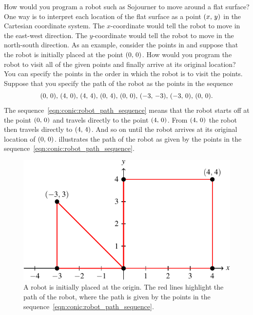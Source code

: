 \documentclass[a4paper,oneside,12pt]{article}
\begin{document}
How would you program a robot such as Sojourner to move around a flat
surface?  One way is to interpret each location of the flat surface as
a point $\left\lparen{x},\, {y}\right\rparen$ in the Cartesian coordinate system.  The
$x$-coordinate would tell the robot to move in the east-west
direction.  The $y$-coordinate would tell the robot to move in the
north-south direction.  As an example, consider the points in
 and suppose that the robot is
initially placed at the point $\left\lparen{0},\, {0}\right\rparen$.  How would you program
the robot to visit all of the given points and finally arrive at its
original location?  You can specify the points in the order in which
the robot is to visit the points.  Suppose that you specify the path
of the robot as the points in the sequence
\begin{equation}
\label{eqn:conic:robot_path_sequence}
\tuple{0}{0}\comma
\tuple{4}{0}\comma
\tuple{4}{4}\comma
\tuple{0}{4}\comma
\tuple{0}{0}\comma
\tuple{-3}{-3}\comma
\tuple{-3}{0}\comma
\tuple{0}{0}.
\end{equation}
The sequence~\eqref{eqn:conic:robot_path_sequence} means that the
robot starts off at the point $\left\lparen{0},\, {0}\right\rparen$ and travels directly to
the point $\left\lparen{4},\, {0}\right\rparen$.  From $\left\lparen{4},\, {0}\right\rparen$ the robot then travels
directly to $\left\lparen{4},\, {4}\right\rparen$.  And so on until the robot arrives at its
original location of $\left\lparen{0},\, {0}\right\rparen$.
 illustrates the path of
the robot as given by the points in the
sequence~\eqref{eqn:conic:robot_path_sequence}.

\begin{figure}[!htbp]
\centering
\includegraphics[scale=1.1]{image/14/robot-path-square-triangle.pdf}
\caption{%
  A robot is initially placed at the origin.  The red lines highlight
  the path of the robot, where the path is given by the points in the
  sequence~\eqref{eqn:conic:robot_path_sequence}.
}
\label{fig:conic:robot_path_square_triangle}
\end{figure}
\end{document}
